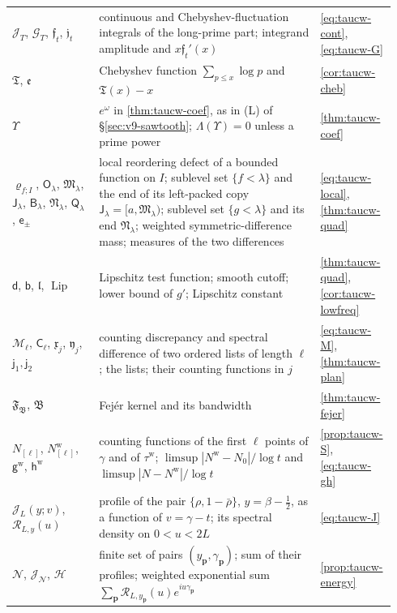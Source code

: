 \documentclass[11pt,a4paper]{article}
\numberwithin{equation}{section}
\theoremstyle{definition}
\theoremstyle{remark}
\begin{document}
\begin{longtable}{@{}p{0.22\linewidth}p{0.56\linewidth}p{0.16\linewidth}@{}}
$\mathscr J_T$, $\mathscr G_T$, $\mathfrak f_t$, $\mathfrak j_t$ & continuous and Chebyshev-fluctuation integrals of the long-prime part; integrand amplitude and $x\mathfrak f_t'(x)$ & \eqref{eq:taucw-cont}, \eqref{eq:taucw-G}\\
$\mathfrak T$, $\mathfrak e$ & Chebyshev function $\sum_{p\le x}\log p$ and $\mathfrak T(x)-x$ & \cref{cor:taucw-cheb}\\
$\Upsilon$ & $e^\omega$ in \cref{thm:taucw-coef}, as in (L) of \S\ref{sec:v9-sawtooth}; $\Lambda(\Upsilon)=0$ unless a prime power & \cref{thm:taucw-coef}\\
$\varrho_{f;I}$, $\mathsf O_\lambda$, $\mathfrak M_\lambda$, $\mathsf J_\lambda$, $\mathsf B_\lambda$, $\mathfrak N_\lambda$, $\mathsf Q_\lambda$, $\mathsf e_\pm$ & local reordering defect of a bounded function on $I$; sublevel set $\{f<\lambda\}$ and the end of its left-packed copy $\mathsf J_\lambda=[a,\mathfrak M_\lambda)$; sublevel set $\{g<\lambda\}$ and its end $\mathfrak N_\lambda$; weighted symmetric-difference mass; measures of the two differences & \eqref{eq:taucw-local}, \cref{thm:taucw-quad}\\
$\mathsf d$, $\mathsf b$, $\mathfrak l$, $\operatorname{Lip}$ & Lipschitz test function; smooth cutoff; lower bound of $g'$; Lipschitz constant & \cref{thm:taucw-quad}, \cref{cor:taucw-lowfreq}\\
$\mathscr M_\ell$, $\mathsf C_\ell$, $\mathfrak x_j$, $\mathfrak y_j$, $\mathsf j_1,\mathsf j_2$ & counting discrepancy and spectral difference of two ordered lists of length $\ell$; the lists; their counting functions in $j$ & \eqref{eq:taucw-M}, \cref{thm:taucw-plan}\\
$\mathfrak F_{\mathfrak B}$, $\mathfrak B$ & Fej\'er kernel and its bandwidth & \cref{thm:taucw-fejer}\\
$N_{[\ell]}$, $N^{\mathrm w}_{[\ell]}$, $\mathsf g^{\mathrm w}$, $\mathsf h^{\mathrm w}$ & counting functions of the first $\ell$ points of $\gamma$ and of $\tau^{\mathrm w}$; $\limsup|N^{\mathrm w}-N_0|/\log t$ and $\limsup|N-N^{\mathrm w}|/\log t$ & \cref{prop:taucw-S}, \eqref{eq:taucw-gh}\\
$\mathcal J_L(y;v)$, $\mathscr R_{L,y}(u)$ & profile of the pair $\{\rho,1-\bar\rho\}$, $y=\beta-\frac12$, as a function of $v=\gamma-t$; its spectral density on $0<u<2L$ & \eqref{eq:taucw-J}\\
$\mathcal N$, $\mathcal J_{\mathcal N}$, $\mathcal H$ & finite set of pairs $(y_{\mathbf p},\gamma_{\mathbf p})$; sum of their profiles; weighted exponential sum $\sum_{\mathbf p}\mathscr R_{L,y_{\mathbf p}}(u)e^{iu\gamma_{\mathbf p}}$ & \cref{prop:taucw-energy}\\

\end{longtable}
\end{document}
